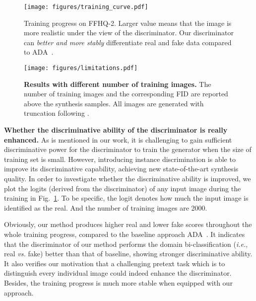 \documentclass{article}
\begin{document}
\begin{figure}[t]
	\centering
	\texttt{[image: figures/training\_curve.pdf]}
	\vspace{-20pt}
 	\caption{
        Training progress on FFHQ-2.
Larger value means that the image is more realistic under the view of the discriminator.
Our discriminator can \textit{better and more stably} differentiate real and fake data compared to ADA~\cite{karras2020training}.
 	}
    \label{fig:prob}
    \vspace{-5pt}
\end{figure}


\begin{figure}[t]
	\centering
	\texttt{[image: figures/limitations.pdf]}
	\vspace{-20pt}
	\caption{
	    \textbf{Results with different number of training images.}
The number of training images and the corresponding FID are reported above the synthesis samples.
All images are generated with truncation following \cite{karras2020training}.
	}
    \label{fig:limitations}
    \vspace{-5pt}
\end{figure}


\noindent\textbf{Whether the discriminative ability of the discriminator is really enhanced.}
As is mentioned in our work, it is challenging to gain sufficient discriminative power for the discriminator to train the generator when the size of training set is small. However, introducing instance discrimination is able to improve its discriminative capability, achieving new state-of-the-art synthesis quality. In order to investigate whether the discriminative ability is improved, we plot the logits (derived from the discriminator) of any input image during the training in Fig.~\ref{fig:prob}. To be specific, the logit denotes how much the input image is identified as the real. And the number of training images are 2000.


Obviously, our method produces higher real and lower fake scores throughout the whole training progress, compared to the baseline approach ADA~\cite{karras2020training}. It indicates that the discriminator of our method performs the domain bi-classification (\textit{i.e.}, real \textit{vs.} fake) better than that of baseline, showing stronger discriminative ability. It also verifies our motivation that a challenging pretext task which is to distinguish every individual image could indeed enhance the discriminator. Besides, the training progress is much more stable when equipped with our approach.
\end{document}
